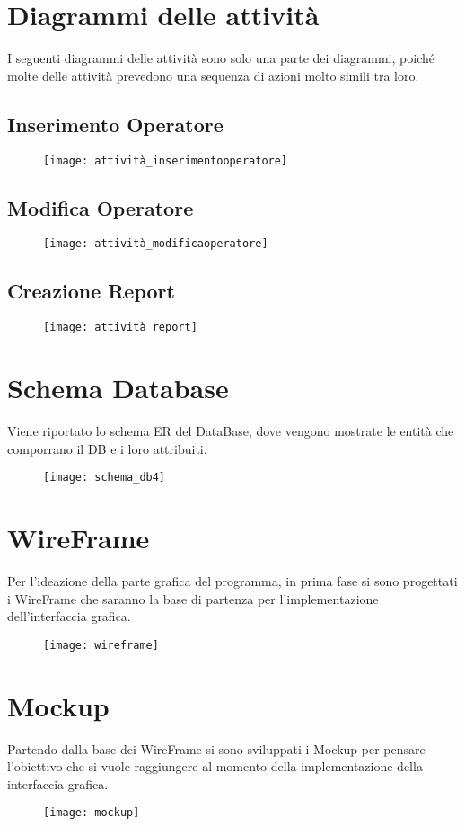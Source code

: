 \documentclass[green, fancy, 11pt]{elegantbook}
\begin{document}
\section{Diagrammi delle attività}
\noindent  I seguenti diagrammi delle attività sono solo una parte dei diagrammi, poiché molte delle attività prevedono una sequenza di azioni molto simili tra loro.
{\center
\subsection{Inserimento Operatore}
\begin{figure}[H]
	\texttt{[image: attività\_inserimentooperatore]}
\end{figure}
\newpage
\subsection{Modifica Operatore}
\begin{figure}[H]
	\texttt{[image: attività\_modificaoperatore]}
\end{figure}
\newpage
\subsection{Creazione Report}
\begin{figure}[H]
	\texttt{[image: attività\_report]}
\end{figure}
\newpage
}

\section{Schema Database}
Viene riportato lo schema ER del DataBase, dove vengono mostrate le entità che comporrano il DB e i loro attribuiti.
\begin{figure}[H]
	\texttt{[image: schema\_db4]}
\end{figure}

\newpage
\section{WireFrame}
Per l'ideazione della parte grafica del programma, in prima fase si sono progettati i WireFrame che saranno la base di partenza per l'implementazione dell'interfaccia grafica.
\begin{figure}[H]
	\texttt{[image: wireframe]}
\end{figure}

\newpage
\section{Mockup}
Partendo dalla base dei WireFrame si sono sviluppati i Mockup per pensare l'obiettivo che si vuole raggiungere al momento della implementazione della interfaccia grafica.
\begin{figure}[H]
	\texttt{[image: mockup]}
\end{figure}
\end{document}
